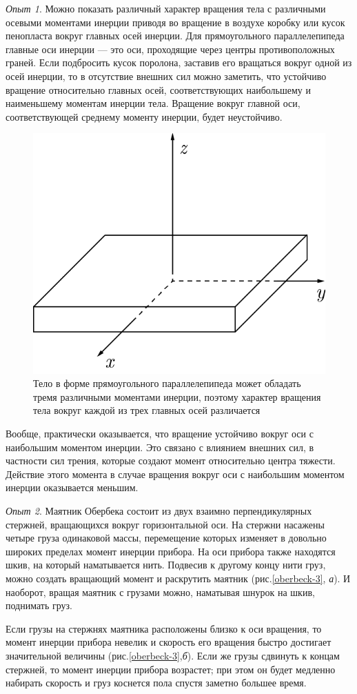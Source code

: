 \documentclass[14pt,a4paper,oneside]{extarticle}	%
\begin{document}
	\textit{Опыт 1}. 
	Можно показать различный характер вращения тела с различными осевыми моментами инерции приводя во вращение в воздухе коробку или кусок пенопласта вокруг главных осей инерции.
	Для прямоугольного параллелепипеда главные оси инерции — это оси, проходящие через центры противоположных граней.
	Если подбросить кусок поролона, заставив его вращаться вокруг одной из осей инерции, то в отсутствие внешних сил можно заметить, что устойчиво вращение относительно главных осей, соответствующих наибольшему и наименьшему моментам инерции тела.
	Вращение вокруг главной оси, соответствующей среднему моменту инерции, будет неустойчиво.
	\begin{figure}[H] 	
		\centering 	
		\includegraphics[width=0.45\linewidth]{oberbeck-2.png}
		\caption{Тело в форме прямоугольного параллелепипеда может обладать тремя различными моментами инерции, поэтому характер вращения тела вокруг каждой из трех главных осей различается}
		\label{oberbeck-2}
	\end{figure}
	
	Вообще, практически оказывается, что вращение устойчиво вокруг оси с наибольшим моментом инерции.
	Это связано с влиянием внешних сил, в частности сил трения, которые создают момент относительно центра тяжести.
	Действие этого момента в случае вращения вокруг оси с наибольшим моментом инерции оказывается меньшим.
	
	\textit{Опыт 2}. Маятник Обербека состоит из двух взаимно перпендикулярных стержней, вращающихся вокруг горизонтальной оси.
На стержни насажены четыре груза одинаковой массы, перемещение которых изменяет в довольно широких пределах момент инерции прибора. 
На оси прибора также находятся шкив, на который наматывается нить.
Подвесив к другому концу нити груз, можно создать вращающий момент и раскрутить маятник (рис.\ref{oberbeck-3}, \textit{а}).
И наоборот, вращая маятник с грузами можно, наматывая шнурок на шкив, поднимать груз.

Если грузы на стержнях маятника расположены близко к оси вращения, то момент инерции прибора невелик и скорость его вращения быстро достигает значительной величины (рис.\ref{oberbeck-3},\textit{б}).
Если же грузы сдвинуть к концам стержней, то момент инерции прибора возрастет; при этом он будет медленно набирать скорость и груз коснется пола спустя заметно большее время.
\end{document}
